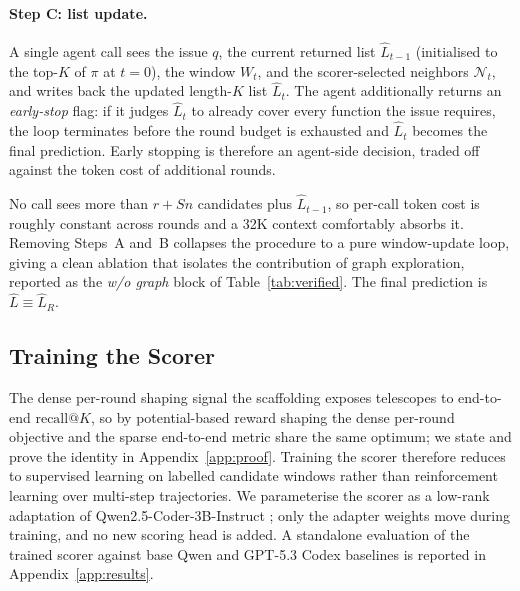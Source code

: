 \paragraph{Step C: list update.}
A single agent call sees the issue $q$, the current returned
list $\hat{L}_{t-1}$ (initialised to the top-$K$ of $\pi$ at
$t{=}0$), the window $W_t$, and the scorer-selected neighbors
$\mathcal{N}_t$, and writes back the updated length-$K$ list
$\hat{L}_t$. The agent additionally returns an \emph{early-stop}
flag: if it judges $\hat{L}_t$ to already cover every function
the issue requires, the loop terminates before the round budget
is exhausted and $\hat{L}_t$ becomes the final prediction.
Early stopping is therefore an agent-side decision, traded off
against the token cost of additional rounds.

No call sees more than $r + Sn$ candidates plus $\hat{L}_{t-1}$, so
per-call token cost is roughly constant across rounds and a
32K context comfortably absorbs it. Removing Steps~A and~B
collapses the procedure to a pure window-update loop, giving a
clean ablation that isolates the contribution of graph
exploration, reported as the \emph{w/o graph} block of
Table~\ref{tab:verified}. The final prediction is
$\hat{L} \equiv \hat{L}_R$.

\subsection{Training the Scorer}
\label{sec:training}

The dense per-round shaping signal the scaffolding exposes
telescopes to end-to-end $\text{recall}@K$, so by potential-based
reward shaping \citep{ng1999policy} the dense per-round objective
and the sparse end-to-end metric share the same optimum; we state
and prove the identity in Appendix~\ref{app:proof}. Training the
scorer therefore reduces to supervised learning on labelled
candidate windows rather than reinforcement learning over
multi-step trajectories. We parameterise the scorer as a low-rank
adaptation \citep{hu2022lora} of Qwen2.5-Coder-3B-Instruct
\citep{hui2024qwen25codertechnicalreport}; only the adapter
weights move during training, and no new scoring head is added.
A standalone evaluation of the trained scorer against base
Qwen and GPT-5.3 Codex baselines is reported in
Appendix~\ref{app:results}.

